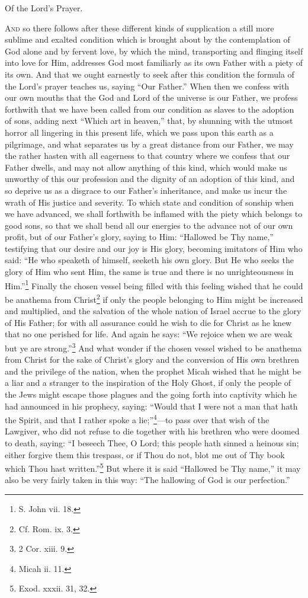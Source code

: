 Of the Lord’s Prayer.

\textsc{And} so there follows after these different kinds of supplication a still more sublime and exalted condition which is brought about by the contemplation of God alone and by fervent love, by which the mind, transporting and flinging itself into love for Him, addresses God most familiarly as its own Father with a piety of its own. And that we ought earnestly to seek after this condition the formula of the Lord’s prayer teaches us, saying “Our Father.” When then we confess with our own mouths that the God and Lord of the universe is our Father, we profess forthwith that we have been called from our condition as slaves to the adoption of sons, adding next “Which art in heaven,” that, by shunning with the utmost horror all lingering in this present life, which we pass upon this earth as a pilgrimage, and what separates us by a great distance from our Father, we may the rather hasten with all eagerness to that country where we confess that our Father dwells, and may not allow anything of this kind, which would make us unworthy of this our profession and the dignity of an adoption of this kind, and so deprive us as a disgrace to our Father’s inheritance, and make us incur the wrath of His justice and severity. To which state and condition of sonship when we have advanced, we shall forthwith be inflamed with the piety which belongs to good sons, so that we shall bend all our energies to the advance not of our own profit, but of our Father’s glory, saying to Him: “Hallowed be Thy name,” testifying that our desire and our joy is His glory, becoming imitators of Him who said: “He who speaketh of himself, seeketh his own glory. But He who seeks the glory of Him who sent Him, the same is true and there is no unrighteousness in Him.”\footnote{S. John vii. 18.} Finally the chosen vessel being filled with this feeling wished that he could be anathema from Christ\footnote{Cf. Rom. ix. 3.} if only the people belonging to Him might be increased and multiplied, and the salvation of the whole nation of Israel accrue to the glory of His Father; for with all assurance could he wish to die for Christ as he knew that no one perished for life. And again he says: “We rejoice when we are weak but ye are strong.”\footnote{2 Cor. xiii. 9.} And what wonder if the chosen vessel wished to be anathema from Christ for the sake of Christ’s glory and the conversion of His own brethren and the privilege of the nation, when the prophet Micah wished that he might be a liar and a stranger to the inspiration of the Holy Ghost, if only the people of the Jews might escape those plagues and the going forth into captivity which he had announced in his prophecy, saying: “Would that I were not a man that hath the Spirit, and that I rather spoke a lie;”\footnote{Micah ii. 11.}—to pass over that wish of the Lawgiver, who did not refuse to die together with his brethren who were doomed to death, saying: “I beseech Thee, O Lord; this people hath sinned a heinous sin; either forgive them this trespass, or if Thou do not, blot me out of Thy book which Thou hast written.”\footnote{Exod. xxxii. 31, 32.} But where it is said “Hallowed be Thy name,” it may also be very fairly taken in this way: “The hallowing of God is our perfection.” 